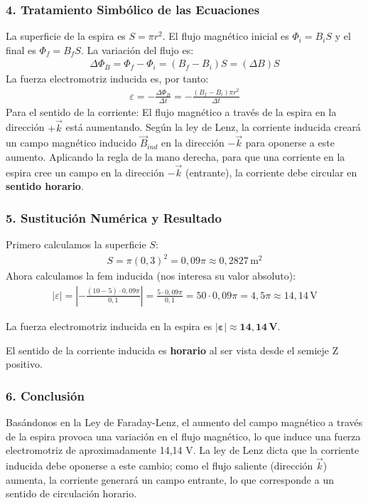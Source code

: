 \subsubsection*{4. Tratamiento Simbólico de las Ecuaciones}
La superficie de la espira es $S = \pi r^2$. El flujo magnético inicial es $\Phi_i = B_i S$ y el final es $\Phi_f = B_f S$.
La variación del flujo es:
\begin{gather}
    \Delta\Phi_B = \Phi_f - \Phi_i = (B_f - B_i) S = (\Delta B) S
\end{gather}
La fuerza electromotriz inducida es, por tanto:
\begin{gather}
    \varepsilon = - \frac{\Delta\Phi_B}{\Delta t} = - \frac{(B_f - B_i) \pi r^2}{\Delta t}
\end{gather}
Para el sentido de la corriente: El flujo magnético a través de la espira en la dirección $+\vec{k}$ está aumentando. Según la ley de Lenz, la corriente inducida creará un campo magnético inducido $\vec{B}_{ind}$ en la dirección $-\vec{k}$ para oponerse a este aumento. Aplicando la regla de la mano derecha, para que una corriente en la espira cree un campo en la dirección $-\vec{k}$ (entrante), la corriente debe circular en \textbf{sentido horario}.

\subsubsection*{5. Sustitución Numérica y Resultado}
Primero calculamos la superficie $S$:
\begin{gather}
    S = \pi (0,3)^2 = 0,09\pi \approx 0,2827 \, \text{m}^2
\end{gather}
Ahora calculamos la fem inducida (nos interesa su valor absoluto):
\begin{gather}
    |\varepsilon| = \left| - \frac{(10 - 5) \cdot 0,09\pi}{0,1} \right| = \frac{5 \cdot 0,09\pi}{0,1} = 50 \cdot 0,09\pi = 4,5\pi \approx 14,14 \, \text{V}
\end{gather}
\begin{cajaresultado}
    La fuerza electromotriz inducida en la espira es $\boldsymbol{|\varepsilon| \approx 14,14 \, \textbf{V}}$.
\end{cajaresultado}
\medskip
\begin{cajaresultado}
    El sentido de la corriente inducida es \textbf{horario} al ser vista desde el semieje Z positivo.
\end{cajaresultado}

\subsubsection*{6. Conclusión}
\begin{cajaconclusion}
    Basándonos en la Ley de Faraday-Lenz, el aumento del campo magnético a través de la espira provoca una variación en el flujo magnético, lo que induce una fuerza electromotriz de aproximadamente 14,14 V. La ley de Lenz dicta que la corriente inducida debe oponerse a este cambio; como el flujo saliente (dirección $\vec{k}$) aumenta, la corriente generará un campo entrante, lo que corresponde a un sentido de circulación horario.
\end{cajaconclusion}

